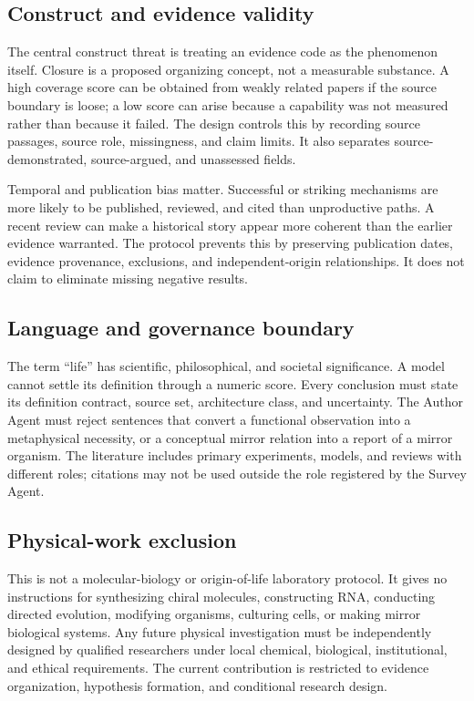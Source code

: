 \documentclass[conference]{IEEEtran}
\begin{document}
\subsection{Construct and evidence validity}

The central construct threat is treating an evidence code as the phenomenon itself. Closure is a proposed organizing concept, not a measurable substance. A high coverage score can be obtained from weakly related papers if the source boundary is loose; a low score can arise because a capability was not measured rather than because it failed. The design controls this by recording source passages, source role, missingness, and claim limits. It also separates source-demonstrated, source-argued, and unassessed fields.

Temporal and publication bias matter. Successful or striking mechanisms are more likely to be published, reviewed, and cited than unproductive paths. A recent review can make a historical story appear more coherent than the earlier evidence warranted. The protocol prevents this by preserving publication dates, evidence provenance, exclusions, and independent-origin relationships. It does not claim to eliminate missing negative results.

\subsection{Language and governance boundary}

The term ``life'' has scientific, philosophical, and societal significance. A model cannot settle its definition through a numeric score. Every conclusion must state its definition contract, source set, architecture class, and uncertainty. The Author Agent must reject sentences that convert a functional observation into a metaphysical necessity, or a conceptual mirror relation into a report of a mirror organism. The literature includes primary experiments, models, and reviews with different roles; citations may not be used outside the role registered by the Survey Agent.

\subsection{Physical-work exclusion}

This is not a molecular-biology or origin-of-life laboratory protocol. It gives no instructions for synthesizing chiral molecules, constructing RNA, conducting directed evolution, modifying organisms, culturing cells, or making mirror biological systems. Any future physical investigation must be independently designed by qualified researchers under local chemical, biological, institutional, and ethical requirements. The current contribution is restricted to evidence organization, hypothesis formation, and conditional research design.
\end{document}
